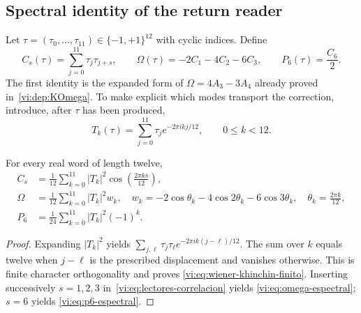 \subsection{Spectral identity of the return reader}

Let $\tau=(\tau_0,\ldots,\tau_{11})\in\{-1,+1\}^{12}$ with cyclic indices.
Define
\begin{equation}
 C_s(\tau)=\sum_{j=0}^{11}\tau_j\tau_{j+s},
 \qquad
 \Omega(\tau)=-2C_1-4C_2-6C_3,
 \qquad
 P_6(\tau)=\frac{C_6}{2}.
 \label{vi:eq:lectores-correlacion}
\end{equation}
The first identity is the expanded form of $\Omega=4A_3-3A_4$ already
proved in~\eqref{vi:dep:KOmega}. To make explicit which modes transport the
correction, introduce, after $\tau$ has been produced,
\begin{equation}
 T_k(\tau)=\sum_{j=0}^{11}\tau_j
 e^{-2\pi i k j/12},\qquad 0\leq k<12.
 \label{vi:eq:dft-retorno}
\end{equation}

\begin{proposition}
For every real word of length twelve,
\begin{align}
 C_s&=\frac1{12}\sum_{k=0}^{11}|T_k|^2
          \cos\!\left(\frac{2\pi ks}{12}\right),\label{vi:eq:wiener-khinchin-finito}\\
 \Omega&=\frac1{12}\sum_{k=0}^{11}|T_k|^2w_k,
 \quad
 w_k=-2\cos\theta_k-4\cos2\theta_k-6\cos3\theta_k,
 \quad\theta_k=\frac{2\pi k}{12},\label{vi:eq:omega-espectral}\\
 P_6&=\frac1{24}\sum_{k=0}^{11}|T_k|^2(-1)^k.
 \label{vi:eq:p6-espectral}
\end{align}
\end{proposition}
\begin{proof}
Expanding $|T_k|^2$ yields
$\sum_{j,\ell}\tau_j\tau_\ell e^{-2\pi ik(j-\ell)/12}$.
The sum over $k$ equals twelve when $j-\ell$ is the prescribed displacement
and vanishes otherwise. This is finite character orthogonality and proves
\eqref{vi:eq:wiener-khinchin-finito}. Inserting successively $s=1,2,3$
in~\eqref{vi:eq:lectores-correlacion} yields
\eqref{vi:eq:omega-espectral}; $s=6$ yields
\eqref{vi:eq:p6-espectral}.
\end{proof}

